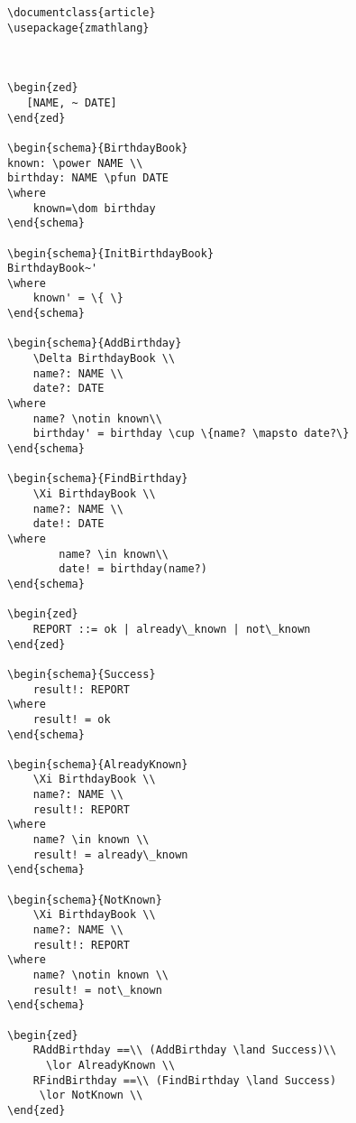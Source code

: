 \begin{verbatim}
\documentclass{article}
\usepackage{zmathlang}



\begin{zed}
   [NAME, ~ DATE] 
\end{zed}

\begin{schema}{BirthdayBook}
known: \power NAME \\ 
birthday: NAME \pfun DATE 
\where 
	known=\dom birthday
\end{schema}

\begin{schema}{InitBirthdayBook} 
BirthdayBook~' 
\where 
	known' = \{ \}
\end{schema}

\begin{schema}{AddBirthday}
    \Delta BirthdayBook \\
    name?: NAME \\
    date?: DATE
\where
    name? \notin known\\
    birthday' = birthday \cup \{name? \mapsto date?\}
\end{schema}

\begin{schema}{FindBirthday}
    \Xi BirthdayBook \\
    name?: NAME \\
    date!: DATE 
\where
    	name? \in known\\
    	date! = birthday(name?)
\end{schema}

\begin{zed} 
    REPORT ::= ok | already\_known | not\_known
\end{zed}

\begin{schema}{Success}
    result!: REPORT
\where
    result! = ok
\end{schema}

\begin{schema}{AlreadyKnown}
    \Xi BirthdayBook \\
    name?: NAME \\
    result!: REPORT
\where
	name? \in known \\
	result! = already\_known
\end{schema}

\begin{schema}{NotKnown}
    \Xi BirthdayBook \\
    name?: NAME \\
    result!: REPORT
\where
	name? \notin known \\
	result! = not\_known
\end{schema}

\begin{zed} 
    RAddBirthday ==\\ (AddBirthday \land Success)\\
      \lor AlreadyKnown \\
    RFindBirthday ==\\ (FindBirthday \land Success)
     \lor NotKnown \\
\end{zed}


\end{verbatim}